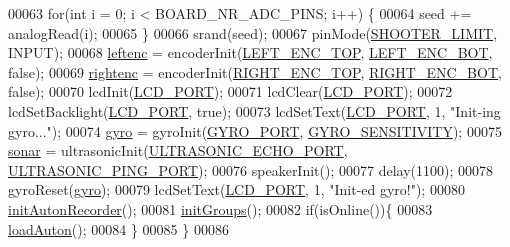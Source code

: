 \begin{DoxyCode}
00063     \textcolor{keywordflow}{for}(\textcolor{keywordtype}{int} i = 0; i < BOARD\_NR\_ADC\_PINS; i++) \{
00064         seed += analogRead(i);
00065     \}
00066     srand(seed);
00067     pinMode(\hyperlink{sensors_8h_a354b5ed50c08708ba703ca9e9121a0cf}{SHOOTER\_LIMIT}, INPUT);
00068     \hyperlink{sensors_8c_a48ead63071a2b65b87a166928a5a5c08}{leftenc} = encoderInit(\hyperlink{sensors_8h_ad0ae0aded49835e75c52bc506585f5a6}{LEFT\_ENC\_TOP}, \hyperlink{sensors_8h_ae913e0b80ef027d0a619e59a3d2ffb85}{LEFT\_ENC\_BOT}, \textcolor{keyword}{false});
00069     \hyperlink{sensors_8c_a8c853ba918673c4878ab6935c54969e4}{rightenc} = encoderInit(\hyperlink{sensors_8h_a07c1c0ceab9fee6088955b2b2706e515}{RIGHT\_ENC\_TOP}, \hyperlink{sensors_8h_a76290ef36d8c093e1d380e26d1d01f6a}{RIGHT\_ENC\_BOT}, \textcolor{keyword}{false});
00070     lcdInit(\hyperlink{lcdmsg_8h_abcf42bd88b3c36193f301ca25b033875}{LCD\_PORT});
00071     lcdClear(\hyperlink{lcdmsg_8h_abcf42bd88b3c36193f301ca25b033875}{LCD\_PORT});
00072     lcdSetBacklight(\hyperlink{lcdmsg_8h_abcf42bd88b3c36193f301ca25b033875}{LCD\_PORT}, \textcolor{keyword}{true});
00073     lcdSetText(\hyperlink{lcdmsg_8h_abcf42bd88b3c36193f301ca25b033875}{LCD\_PORT}, 1, \textcolor{stringliteral}{"Init-ing gyro..."});
00074     \hyperlink{sensors_8c_ad2d059cd4baeedd5fbead13085953eed}{gyro} = gyroInit(\hyperlink{sensors_8h_a51d281e7676749d34aab3f8ba6fab960}{GYRO\_PORT}, \hyperlink{sensors_8h_a6e58fcea626847c9734cdc19eb93a6c5}{GYRO\_SENSITIVITY});
00075     \hyperlink{sensors_8c_a09e334aba0637f228c65c135f428606a}{sonar} = ultrasonicInit(\hyperlink{sensors_8h_ac6e827f0a9c2f52b4d935274daad778a}{ULTRASONIC\_ECHO\_PORT}, 
      \hyperlink{sensors_8h_a97be84893513dc7afb5c4c26b7bdd074}{ULTRASONIC\_PING\_PORT});
00076     speakerInit();
00077     delay(1100);
00078     gyroReset(\hyperlink{sensors_8c_ad2d059cd4baeedd5fbead13085953eed}{gyro});
00079     lcdSetText(\hyperlink{lcdmsg_8h_abcf42bd88b3c36193f301ca25b033875}{LCD\_PORT}, 1, \textcolor{stringliteral}{"Init-ed gyro!"});
00080     \hyperlink{autonrecorder_8c_acd89c8b2c622ae271c5d63d7fb8fa5f6}{initAutonRecorder}();
00081     \hyperlink{lcddiag_8c_ad290df3e273598f9f10fe34c257e4084}{initGroups}();
00082     \textcolor{keywordflow}{if}(isOnline())\{
00083         \hyperlink{autonrecorder_8c_af6d130061f44459f9b3c629123e78f6e}{loadAuton}();
00084     \}
00085 \}
00086 
\end{DoxyCode}
